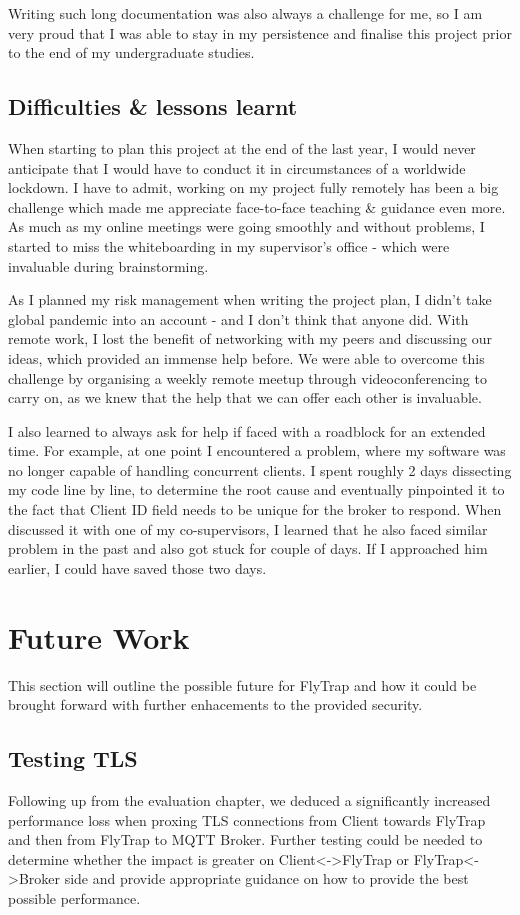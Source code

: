 Writing such long documentation was also always a challenge for me, so I am very proud that I was able to stay in my persistence and finalise this project prior to the end of my undergraduate studies. 

\subsection{Difficulties \& lessons learnt}
When starting to plan this project at the end of the last year, I would never anticipate that I would have to conduct it in circumstances of a worldwide lockdown. I have to admit, working on my project fully remotely has been a big challenge which made me appreciate face-to-face teaching \& guidance even more. As much as my online meetings were going smoothly and without problems, I started to miss the whiteboarding in my supervisor's office - which were invaluable during brainstorming.

As I planned my risk management when writing the project plan, I didn't take global pandemic into an account - and I don't think that anyone did. With remote work, I lost the benefit of networking with my peers and discussing our ideas, which provided an immense help before. We were able to overcome this challenge by organising a weekly remote meetup through videoconferencing to carry on, as we knew that the help that we can offer each other is invaluable.

I also learned to always ask for help if faced with a roadblock for an extended time. For example, at one point I encountered a problem, where my software was no longer capable of handling concurrent clients. I spent roughly 2 days dissecting my code line by line, to determine the root cause and eventually pinpointed it to the fact that Client ID field needs to be unique for the broker to respond. When discussed it with one of my co-supervisors, I learned that he also faced similar problem in the past and also got stuck for couple of days. If I approached him earlier, I could have saved those two days.

\section{Future Work}
This section will outline the possible future for FlyTrap and how it could be brought forward with further enhacements to the provided security.
\subsection{Testing TLS}
Following up from the evaluation chapter, we deduced a significantly increased performance loss when proxing TLS connections from Client towards FlyTrap and then from FlyTrap to MQTT Broker. Further testing could be needed to determine whether the impact is greater on \mbox{Client<->FlyTrap} or FlyTrap<->Broker side and provide appropriate guidance on how to provide the best possible performance.

